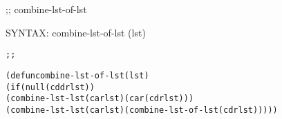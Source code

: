 \begin{aibox}{\function}
;; combine-lst-of-lst

SYNTAX: combine-lst-of-lst (lst)
\end{aibox}

\begin{aibox}{\examples}

\end{aibox}

\begin{aibox}{\comments}

\end{aibox}
\begin{aibox}{\answers}

\end{aibox}
\begin{aibox}{\othercomments}

\end{aibox}
\begin{aibox}{\pseudocode}

\end{aibox}
\begin{aibox}{\code}

\begin{alltt}
;;%% code

(defun combine-lst-of-lst (lst)
    (if (null (cddr lst))
        (combine-lst-lst (car lst) (car (cdr lst)))
        (combine-lst-lst (car lst) (combine-lst-of-lst (cdr lst)))))
\end{alltt}
\end{aibox}
